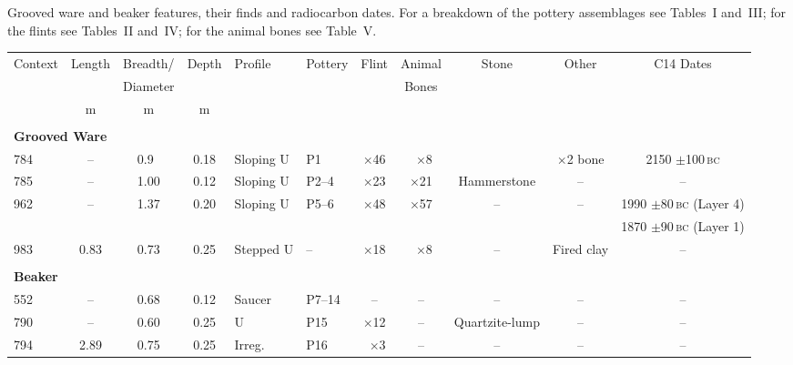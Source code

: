 \begin{table}
  \processtable
  {Grooved ware and beaker features, their finds and
    radiocarbon dates. For a breakdown of the pottery assemblages see
    Tables~I and~III; for the flints see Tables~II and~IV; for the animal
    bones see Table~V.\label{sideways}}
  {\addtolength\tabcolsep{-2pt}
    \begin{tabular}{lcccllccccc}
    Context & Length & Breadth/  & Depth & Profile & Pottery & Flint & Animal
                                                     & Stone & Other & C14 Dates\\
    && Diameter &&&&& Bones\\[6pt]
    & m & m & m\\
    \hline\\[-5pt]
    \multicolumn{10}{l}{\textbf{Grooved Ware}}\\
    784 & --   & 0.9$\phantom{0}$ &0.18  & Sloping U & P1      & $\times$46
          & $\phantom{0}$$\times$8 && $\times$2 bone & 2150 $\pm$100\,\textsc{bc}\\
    785 & --   & 1.00             &0.12   & Sloping U & P2--4  & $\times$23
                                             & $\times$21 & Hammerstone & -- & --\\
    962 & --   & 1.37             &0.20   & Sloping U & P5--6  & $\times$48
                       & $\times$57 & --& --& 1990 $\pm$80\,\textsc{bc} (Layer 4)\\
    &&&&&&&&&& 1870 $\pm$90\,\textsc{bc} (Layer 1)\\
    983 & 0.83 & 0.73             &0.25   & Stepped U & --     & $\times$18
                                  & $\phantom{0}$$\times$8 & -- & Fired clay & --\\
    &&&&&&&&&&\\
    \multicolumn{10}{l}{\textbf{Beaker}}\\
    552 & --   & 0.68             & 0.12  & Saucer    & P7--14 & --           & --
                                                                     & -- &-- &--\\
    790 & --   & 0.60             & 0.25  & U         & P15    & $\times$12   & --
                                                        & Quartzite-lump & -- &--\\
    794 & 2.89 & 0.75             & 0.25  & Irreg.    & P16    & $\phantom{0}$$\times$3
                                                                & -- & -- &-- &--\\
    \end{tabular}}
\end{table}

